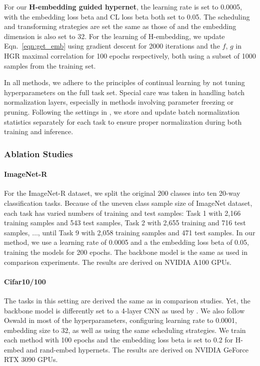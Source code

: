 For our \textbf{H-embedding guided hypernet}, the learning rate is set to 0.0005, with the embedding loss beta and CL loss beta both set to 0.05. The scheduling and transforming strategies are set the same as those of \cite{von2020continual} and the embedding dimension is also set to 32. For the learning of H-embedding, we update Eqn.~\ref{eqn:get_emb} using gradient descent for 2000 iterations and the $f$, $g$ in HGR maximal correlation for 100 epochs respectively, both using a subset of 1000 samples from the training set.

In all methods, we adhere to the principles of continual learning by not tuning hyperparameters on the full task set. Special care was taken in handling batch normalization layers, especially in methods involving parameter freezing or pruning. Following the settings in \cite{von2020continual}, we store and update batch normalization statistics separately for each task to ensure proper normalization during both training and inference.


\subsubsection{Ablation Studies}

\paragraph{ImageNet-R} For the ImageNet-R dataset, we split the original 200 classes into ten 20-way classification tasks. Because of the uneven class sample size of ImageNet dataset, each task has varied numbers of training and test samples: Task 1 with 2,166 training samples and 543 test samples, Task 2 with 2,655 training and 716 test samples, $\dots$, until Task 9 with 2,058 training samples and 471 test samples. In our method, we use a learning rate of 0.0005 and a the embedding loss beta of 0.05, training the models for 200 epochs. The backbone model is the same as used in comparison experiments. The results are derived on NVIDIA A100 GPUs.

\paragraph{Cifar10/100} The tasks in this setting are derived the same as in comparison studies. Yet, the backbone model is differently set to a 4-layer CNN as used by \cite{zenke2017continual}. We also follow Oswald in most of the hyperparameters, configuring learning rate to 0.0001, embedding size to 32, as well as using the same scheduling strategies. We train each method with 100 epochs and the embedding loss beta is set to 0.2 for H-embed and rand-embed hypernets. The results are derived on NVIDIA GeForce RTX 3090 GPUs.

